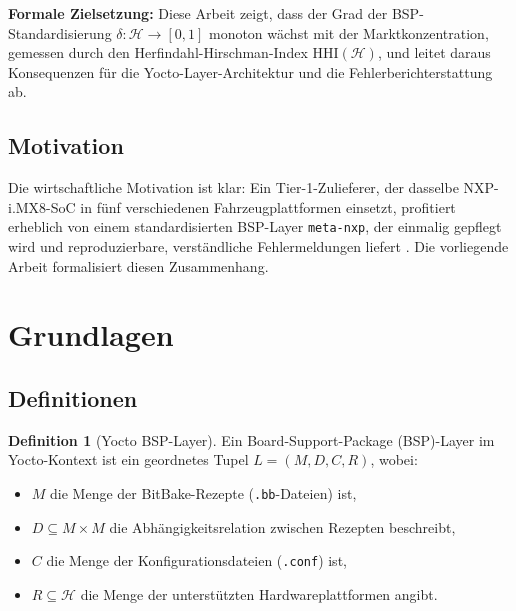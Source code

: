 ﻿\documentclass[a4paper,12pt]{article}
\theoremstyle{definition}
\newtheorem{definition}{Definition}
\begin{document}
\textbf{Formale Zielsetzung:} Diese Arbeit zeigt, dass der Grad der BSP-Standardisierung
$\delta: \mathcal{H} \to [0,1]$ monoton wächst mit der Marktkonzentration, gemessen durch
den Herfindahl-Hirschman-Index $\mathrm{HHI}(\mathcal{H})$, und leitet daraus Konsequenzen
für die Yocto-Layer-Architektur und die Fehlerberichterstattung ab.

\subsection{Motivation}

Die wirtschaftliche Motivation ist klar: Ein Tier-1-Zulieferer, der dasselbe NXP-i.MX8-SoC
in fünf verschiedenen Fahrzeugplattformen einsetzt, profitiert erheblich von einem
standardisierten BSP-Layer \texttt{meta-nxp}, der einmalig gepflegt wird und
reproduzierbare, verständliche Fehlermeldungen liefert \cite{openembedded2024}.
Die vorliegende Arbeit formalisiert diesen Zusammenhang.

\section{Grundlagen}

\subsection{Definitionen}

\begin{definition}[Yocto BSP-Layer]
	Ein Board-Support-Package (BSP)-Layer im Yocto-Kontext ist ein geordnetes Tupel
	$L = (M, D, C, R)$, wobei:
	\begin{itemize}
		\item $M$ die Menge der BitBake-Rezepte (\texttt{.bb}-Dateien) ist,
		\item $D \subseteq M \times M$ die Abhängigkeitsrelation zwischen Rezepten beschreibt,
		\item $C$ die Menge der Konfigurationsdateien (\texttt{.conf}) ist,
		\item $R \subseteq \mathcal{H}$ die Menge der unterstützten Hardwareplattformen angibt.
	\end{itemize}
\end{definition}
\end{document}
